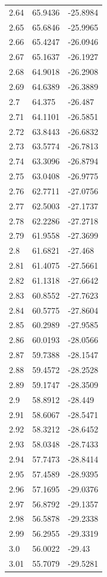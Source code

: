 \begin{table}
\begin{tabular}{lll}
2.64 & 65.9436 & -25.8984 \\
2.65 & 65.6846 & -25.9965 \\
2.66 & 65.4247 & -26.0946 \\
2.67 & 65.1637 & -26.1927 \\
2.68 & 64.9018 & -26.2908 \\
2.69 & 64.6389 & -26.3889 \\
2.7 & 64.375 & -26.487 \\
2.71 & 64.1101 & -26.5851 \\
2.72 & 63.8443 & -26.6832 \\
2.73 & 63.5774 & -26.7813 \\
2.74 & 63.3096 & -26.8794 \\
2.75 & 63.0408 & -26.9775 \\
2.76 & 62.7711 & -27.0756 \\
2.77 & 62.5003 & -27.1737 \\
2.78 & 62.2286 & -27.2718 \\
2.79 & 61.9558 & -27.3699 \\
2.8 & 61.6821 & -27.468 \\
2.81 & 61.4075 & -27.5661 \\
2.82 & 61.1318 & -27.6642 \\
2.83 & 60.8552 & -27.7623 \\
2.84 & 60.5775 & -27.8604 \\
2.85 & 60.2989 & -27.9585 \\
2.86 & 60.0193 & -28.0566 \\
2.87 & 59.7388 & -28.1547 \\
2.88 & 59.4572 & -28.2528 \\
2.89 & 59.1747 & -28.3509 \\
2.9 & 58.8912 & -28.449 \\
2.91 & 58.6067 & -28.5471 \\
2.92 & 58.3212 & -28.6452 \\
2.93 & 58.0348 & -28.7433 \\
2.94 & 57.7473 & -28.8414 \\
2.95 & 57.4589 & -28.9395 \\
2.96 & 57.1695 & -29.0376 \\
2.97 & 56.8792 & -29.1357 \\
2.98 & 56.5878 & -29.2338 \\
2.99 & 56.2955 & -29.3319 \\
3.0 & 56.0022 & -29.43 \\
3.01 & 55.7079 & -29.5281 \\

\end{tabular}
\end{table}
